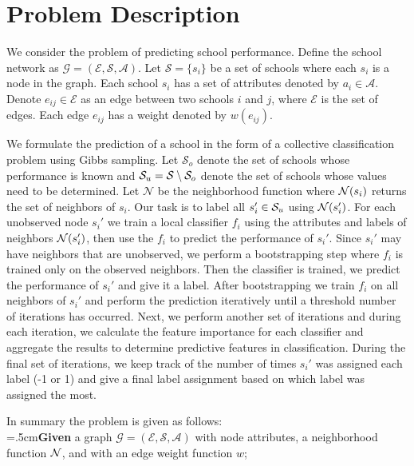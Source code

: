 \section{Problem Description} \label{sec:problem}

We consider the problem of predicting school performance. Define the school network as $\mathcal{G} = (\mathcal{E},\mathcal{S}, \mathcal{A})$. Let $\mathcal{S} = \{s_i\}$ be a set of schools where each $s_i$ is a node in the graph. Each school $s_i$ has a set of attributes denoted by $a_i \in \mathcal{A}$. Denote $e_{ij} \in \mathcal{E}$ as an edge between two schools $i$ and $j$, where $\mathcal{E}$ is the set of edges. Each edge $e_{ij}$ has a weight denoted by $w(e_{ij})$.

We formulate the prediction of a school in the form of a collective classification problem \cite{collective2008} using Gibbs sampling. Let $\mathcal{S}_o$ denote the set of schools whose performance is known and $\mathcal{S}_u = \mathcal{S} \setminus \mathcal{S}_o$ denote the set of schools whose values need to be determined. Let $\mathcal{N}$ be the neighborhood function where $\mathcal{N}(s_i)$ returns the set of neighbors of $s_i$. Our task is to label all $s_i' \in \mathcal{S}_u$ using $\mathcal{N}(s_i')$. For each unobserved node $s_i'$ we train a local classifier $f_i$ using the attributes and labels of neighbors $\mathcal{N}(s_i')$, then use the $f_i$ to predict the performance of $s_i'$. Since $s_i'$ may have neighbors that are unobserved, we perform a bootstrapping step where $f_i$ is trained only on the observed neighbors. Then the classifier is trained, we predict the performance of $s_i'$ and give it a label. After bootstrapping we train $f_i$ on all neighbors of $s_i'$ and perform the prediction iteratively until a threshold number of iterations has occurred. Next, we perform another set of iterations and during each iteration, we calculate the feature importance for each classifier and aggregate the results to determine predictive features in classification. During the final set of iterations, we keep track of the number of times $s_i'$ was assigned each label (-1 or 1) and give a final label assignment based on which label was assigned the most.

In summary the problem is given as follows:\\

\noindent\hangindent=.5cm\textbf{Given} a graph $\mathcal{G} = (\mathcal{E},\mathcal{S}, \mathcal{A})$ with node attributes, a neighborhood function $\mathcal{N}$, and with an edge weight function $w$;


